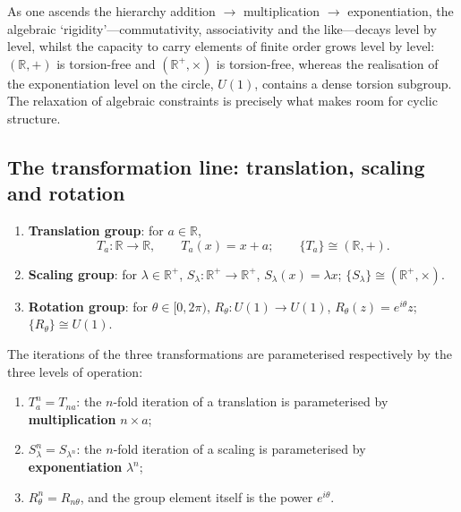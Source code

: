 \begin{remark}\label{rem:hierarchy_duality}
As one ascends the hierarchy addition $\to$ multiplication $\to$ exponentiation, the algebraic `rigidity'---commutativity, associativity and the like---decays level by level, whilst the capacity to carry elements of finite order grows level by level: $(\mathbb{R},+)$ is torsion-free and $(\mathbb{R}^+,\times)$ is torsion-free, whereas the realisation of the exponentiation level on the circle, $U(1)$, contains a dense torsion subgroup. The relaxation of algebraic constraints is precisely what makes room for cyclic structure.
\end{remark}

\subsection{The transformation line: translation, scaling and rotation}

\begin{definition}\label{def:three_transformations}
\begin{enumerate}[label=(\roman*)]
    \item \textbf{Translation group}: for $a\in\mathbb{R}$,
    \[
    T_a:\mathbb{R}\to\mathbb{R},\qquad T_a(x)=x+a;
    \qquad \{T_a\}\cong(\mathbb{R},+).
    \]
    \item \textbf{Scaling group}: for $\lambda\in\mathbb{R}^+$, $S_\lambda:\mathbb{R}^+\to\mathbb{R}^+$, $S_\lambda(x)=\lambda x$; $\{S_\lambda\}\cong(\mathbb{R}^+,\times)$.
    \item \textbf{Rotation group}: for $\theta\in[0,2\pi)$, $R_\theta:U(1)\to U(1)$, $R_\theta(z)=e^{i\theta}z$; $\{R_\theta\}\cong U(1)$.
\end{enumerate}
\end{definition}

\begin{theorem}\label{thm:transformation_iteration}
The iterations of the three transformations are parameterised respectively by the three levels of operation:
\begin{enumerate}[label=(\roman*)]
    \item $T_a^n=T_{na}$: the $n$-fold iteration of a translation is parameterised by \textbf{multiplication} $n\times a$;
    \item $S_\lambda^n=S_{\lambda^n}$: the $n$-fold iteration of a scaling is parameterised by \textbf{exponentiation} $\lambda^n$;
    \item $R_\theta^n=R_{n\theta}$, and the group element itself is the power $e^{i\theta}$.
\end{enumerate}
\end{theorem}

